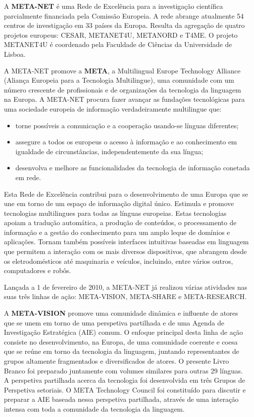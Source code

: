 \begin{multicols}{2} 

A \textbf{META-NET} é uma Rede de Excelência para a investigação científica parcialmente financiada pela Comissão Europeia. A rede abrange atualmente 54 centros de investigação em 33 países da Europa. 
Resulta da agregação de quatro projetos europeus: CESAR, METANET4U, METANORD e T4ME.
O projeto METANET4U é coordenado pela Faculdade de Ciências da Universidade de Lisboa.

A META-NET promove a \textbf{META}, a Multilingual Europe Technology Alliance (Aliança Europeia para a  Tecnologia Multilingue), uma comunidade com um número crescente de profissionais e de organizações da tecnologia da linguagem na Europa. A META-NET procura fazer avançar as fundações tecno\-lógicas para uma sociedade europeia de informação verdadeiramente multilingue que:

\begin{itemize}
    \item torne possíveis a comunicação e a cooperação usando-se línguas diferentes; 
    \item assegure a todos os europeus o acesso à informação e ao conhecimento em igualdade de circunstâncias, independentemente da sua língua; 
    \item desenvolva e melhore as funcionalidades da tecno\-logia de informação conetada em rede. 
\end{itemize}

Esta Rede de Excelência contribui para o desenvolvimento de uma Europa que se une em torno de um espaço de informação di\-gi\-tal único. Estimula e promove tecnologias multilingues para todas as línguas europeias. Estas tecnologias apoiam a tradução automática, a produção de conteúdos, o processamento de informação e a gestão do conhecimento para um amplo leque de domínios e aplicações. Tornam também possíveis interfaces intuitivas baseadas em linguagem que permitem  a interação com os mais diversos dispositivos, 
que abrangem desde os eletrodomésticos até maquinaria e veículos, incluindo, entre vários outros, computadores e robôs.

Lançada a 1 de fevereiro de  2010, a META-NET já realizou várias atividades nas suas três linhas de ação: META-VISION, META-SHARE e META-RESEARCH.

A \textbf{META-VISION} promove uma comunidade dinâmica e influente de atores que se unem em torno de uma perspetiva partilhada e de uma Agenda de Investigação Estratégica (AIE) comum. O enfoque principal desta linha de ação consiste no desenvolvimento, na Europa, de uma comunidade coe\-rente e coesa que se reúne em torno da tecnologia da linguagem, juntando representantes de grupos altamente fragmentados e diversificados de atores. O presente Livro Branco foi preparado juntamente com volumes similares para outras 29 línguas. A perspetiva partilhada acerca da tecnologia foi desenvolvida em três Grupos de Perspetiva setoriais. O META Technology Council foi constituído para discutir e preparar a AIE baseada nessa perspetiva partilhada, 
através de uma interação intensa com toda a comunidade da tecnologia da linguagem.


\end{multicols}
